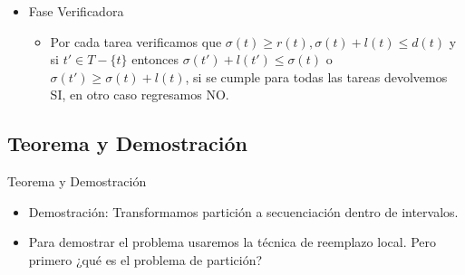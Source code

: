 \begin{frame}{\subsectiontitle}
    \begin{itemize}
    \itemj Fase Adivinadora\\
    \begin{itemize}
        \item Tiramos un dado equilibrado de $|T|$ lados y del número $n$ que salga tomamos la tarea $t_n$ del conjunto $T$, la renombramos como $t_1'$ hacemos su horario factible igual a $\sigma(t_1')=0$ volvemos a tirar el dado y del número $m$ que salga tomamos la tarea $t_m$ del conjunto $T$, y la renombramos como $t_2'$, hacemos el $\sigma (t_2') = \sigma(t_1') + l(t_1')$, ..., volvemos a tirar el dado y del número $j$ que salga tomamos la tarea $t_j$ del conjunto $T$, y la renombramos como $t_i'$, tal que $t_{i-1}'$ sea la tarea anterior a la que le asignamos su horario factible, hacemos el $\sigma (t_i') = \sigma(t_{i-1}') + l(t_{i-1}')$, y hacemos esto hasta asignarle un horario factible a la tarea $t_{|T|}$.
    \end{itemize}
    
    \item Fase Verificadora\\
    \begin{itemize}
        \item Por cada tarea verificamos que $\sigma(t)\geqslant r(t), \sigma(t) + l(t)\leqslant d(t)$ y si $t'\in T-\{t\}$ entonces $\sigma(t')+l(t') \leqslant \sigma(t)$ o $\sigma(t') \geqslant \sigma(t) + l(t)$, si se cumple para todas las tareas devolvemos SI, en otro caso regresamos NO.
    \end{itemize}
    
    
\end{itemize}
\end{frame}

\renewcommand{\subsectiontitle}{Teorema y Demostración}
\subsection{\subsectiontitle}

\begin{frame}{\subsectiontitle}
    \begin{itemize}
        \itemj Teorema: El problema secuenciación dentro de intervalos es NP-Completo.
        \item Demostración: Transformamos partición a secuenciación dentro de intervalos.
        \item Para demostrar el problema usaremos la técnica de reemplazo local. Pero primero ¿qué es el problema de partición?
    \end{itemize}
\end{frame}

